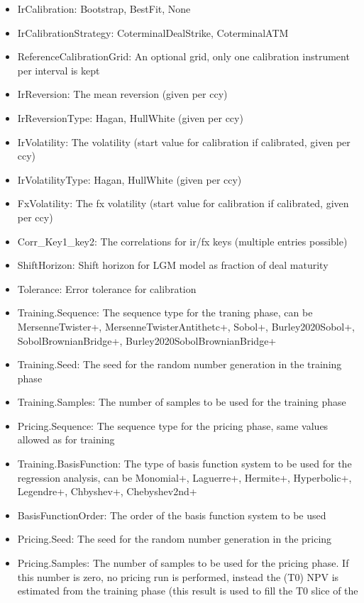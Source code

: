 \begin{itemize}
\item IrCalibration: Bootstrap, BestFit, None
\item IrCalibrationStrategy: CoterminalDealStrike, CoterminalATM
\item ReferenceCalibrationGrid: An optional grid, only one calibration instrument per interval is kept
\item IrReversion: The mean reversion (given per ccy)
\item IrReversionType: Hagan, HullWhite (given per ccy)
\item IrVolatility: The volatility (start value for calibration if calibrated, given per ccy)
\item IrVolatilityType: Hagan, HullWhite (given per ccy)
\item FxVolatility: The fx volatility (start value for calibration if calibrated, given per ccy)
\item Corr\_Key1\_key2: The correlations for ir/fx keys (multiple entries possible)
\item ShiftHorizon: Shift horizon for LGM model as fraction of deal maturity
\item Tolerance: Error tolerance for calibration
\item Training.Sequence: The sequence type for the traning phase, can be MersenneTwister+, MersenneTwisterAntithetc+,
  Sobol+, Burley2020Sobol+, SobolBrownianBridge+, Burley2020SobolBrownianBridge+
\item Training.Seed: The seed for the random number generation in the training phase
\item Training.Samples: The number of samples to be used for the training phase
\item Pricing.Sequence: The sequence type for the pricing phase, same values allowed as for training
\item Training.BasisFunction: The type of basis function system to be used for the regression analysis, can be
  Monomial+, Laguerre+, Hermite+, Hyperbolic+, Legendre+, Chbyshev+, Chebyshev2nd+
\item BasisFunctionOrder: The order of the basis function system to be used
\item Pricing.Seed: The seed for the random number generation in the pricing
\item Pricing.Samples: The number of samples to be used for the pricing phase. If this number is zero, no pricing run is
  performed, instead the (T0) NPV is estimated from the training phase (this result is used to fill the T0 slice of the

\end{itemize}
